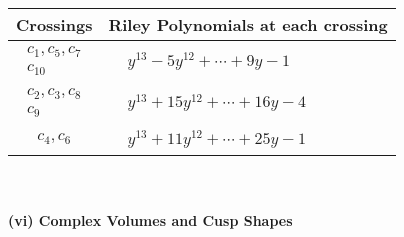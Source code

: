 \documentclass[1p]{elsarticle_modified}
\theoremstyle{definition}
\begin{document}
\begin{tabular}{m{50pt}|m{274pt}}
Crossings & \hspace{64pt}Riley Polynomials at each crossing \\
\hline $$\begin{aligned}c_{1},c_{5},c_{7}\\c_{10}\end{aligned}$$&$\begin{aligned}
&y^{13}-5 y^{12}+\cdots+9 y-1
\end{aligned}$\\
\hline $$\begin{aligned}c_{2},c_{3},c_{8}\\c_{9}\end{aligned}$$&$\begin{aligned}
&y^{13}+15 y^{12}+\cdots+16 y-4
\end{aligned}$\\
\hline $$\begin{aligned}c_{4},c_{6}\end{aligned}$$&$\begin{aligned}
&y^{13}+11 y^{12}+\cdots+25 y-1
\end{aligned}$\\
\hline
\end{tabular}\\~\\
\newpage\flushleft \textbf{(vi) Complex Volumes and Cusp Shapes}
\end{document}
